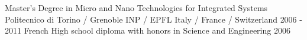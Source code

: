 



\begin{cventries}

  \cventry
    {Master's Degree in Micro and Nano Technologies for Integrated Systems} %
    {Politecnico di Torino / Grenoble INP / EPFL} %
    {Italy / France / Switzerland} %
    {2006 - 2011} %
    {}
  \cventry
    {French High school diploma with honors in Science and Engineering} %
    {} %
    {} %
    {2006} %
    {}

\end{cventries}
